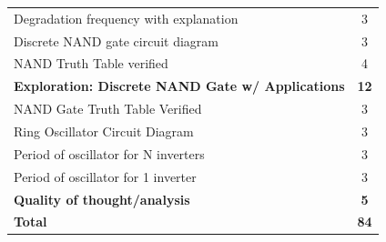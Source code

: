 \documentclass[12pt]{../manual}
\begin{document}
\begin{table}[ht!]
\begin{tabular}{l|c}
Degradation frequency with explanation & 3 \\
Discrete NAND gate circuit diagram & 3 \\
NAND Truth Table verified & 4 \\ \hline
{\bf Exploration: Discrete NAND Gate w/ Applications} & {\bf 12} \\
NAND Gate Truth Table Verified & 3 \\
Ring Oscillator Circuit Diagram & 3 \\
Period of oscillator for N inverters & 3 \\
Period of oscillator for 1 inverter & 3 \\ \hline
{\bf Quality of thought/analysis} & {\bf 5} \\ \hline \hline
{\bf Total}						& {\bf 84} \\ \hline
\end{tabular}
\end{table}
\vfill %
\end{document}
